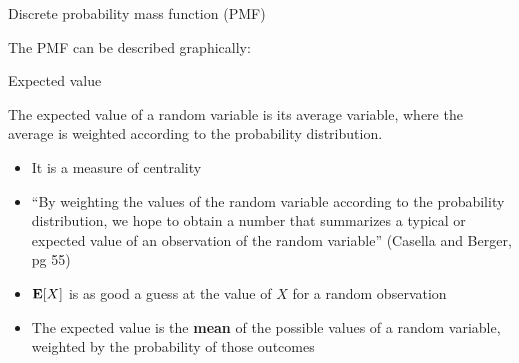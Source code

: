 \documentclass[compress, 8pt]{beamer}
\begin{document}
\begin{frame}{Discrete probability mass function (PMF)}


The PMF can be described graphically: 
\begin{figure}
\end{figure}


\end{frame}

\begin{frame}{Expected value}

The expected value of a random variable is its average variable, where the average is weighted according to the probability distribution. 
\begin{itemize}
    \item It is a measure of centrality
    \item ``By weighting the values of the random variable according to the probability distribution, we hope to obtain a number that summarizes a typical or expected value of an observation of the random variable'' (Casella and Berger, pg 55)
    \item $\mathbf{E} [X]$ is as good a guess at the value of $X$ for a random observation
    \item The expected value is the \textbf{mean} of the possible values of a random variable, weighted by the probability of those outcomes
\end{itemize}


\end{frame}
\end{document}
